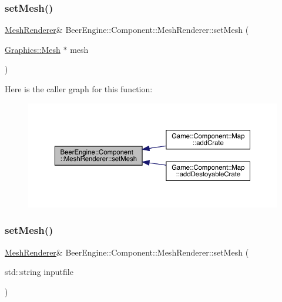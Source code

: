 \subsubsection{\texorpdfstring{set\+Mesh()}{setMesh()}\hspace{0.1cm}{\footnotesize\ttfamily [1/2]}}
{\footnotesize\ttfamily \mbox{\hyperlink{class_beer_engine_1_1_component_1_1_mesh_renderer}{Mesh\+Renderer}}\& Beer\+Engine\+::\+Component\+::\+Mesh\+Renderer\+::set\+Mesh (\begin{DoxyParamCaption}\item[{\mbox{\hyperlink{class_beer_engine_1_1_graphics_1_1_mesh}{Graphics\+::\+Mesh}} $\ast$}]{mesh }\end{DoxyParamCaption})}

Here is the caller graph for this function\+:
\nopagebreak
\begin{figure}[H]
\begin{center}
\leavevmode
\includegraphics[width=350pt]{class_beer_engine_1_1_component_1_1_mesh_renderer_a818276a7fe8703a04bf431a41fa4c907_icgraph}
\end{center}
\end{figure}
\mbox{\label{class_beer_engine_1_1_component_1_1_mesh_renderer_a0bc2f51937864cfb8a470cd9a19321e6}} 
\subsubsection{\texorpdfstring{set\+Mesh()}{setMesh()}\hspace{0.1cm}{\footnotesize\ttfamily [2/2]}}
{\footnotesize\ttfamily \mbox{\hyperlink{class_beer_engine_1_1_component_1_1_mesh_renderer}{Mesh\+Renderer}}\& Beer\+Engine\+::\+Component\+::\+Mesh\+Renderer\+::set\+Mesh (\begin{DoxyParamCaption}\item[{std\+::string}]{inputfile }\end{DoxyParamCaption})}



